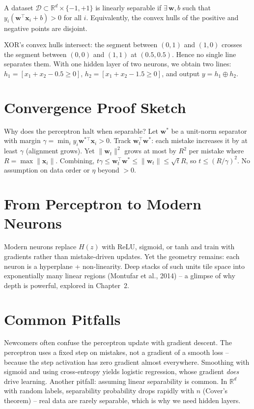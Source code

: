\begin{definition}
A dataset $\mathcal{D}\subset\mathbb{R}^d\times\{-1,+1\}$ is linearly separable
if $\exists\,\mathbf{w},b$ such that $y_i(\mathbf{w}^{\top}\mathbf{x}_i+b)>0$ for all $i$.
Equivalently, the convex hulls of the positive and negative points are disjoint.
\end{definition}

XOR's convex hulls intersect: the segment between $(0,1)$ and $(1,0)$ crosses
the segment between $(0,0)$ and $(1,1)$ at $(0.5,0.5)$. Hence no single line
separates them. With one hidden layer of two neurons, we obtain two lines:
$h_1=[x_1+x_2-0.5\ge0]$, $h_2=[x_1+x_2-1.5\ge0]$, and output $y=h_1\oplus h_2$.

\section{Convergence Proof Sketch}
Why does the perceptron halt when separable? Let $\mathbf{w}^*$ be a unit-norm
separator with margin $\gamma=\min_i y_i\mathbf{w}^{*\top}\mathbf{x}_i>0$.
Track $\mathbf{w}_t^{\top}\mathbf{w}^*$: each mistake increases it by at least
$\gamma$ (alignment grows). Yet $\|\mathbf{w}_t\|^2$ grows at most by $R^2$
per mistake where $R=\max\|\mathbf{x}_i\|$. Combining,
$t\gamma\le\mathbf{w}_t^{\top}\mathbf{w}^*\le\|\mathbf{w}_t\|\le\sqrt{t}R$,
so $t\le(R/\gamma)^2$. No assumption on data order or $\eta$ beyond $>0$.

\section{From Perceptron to Modern Neurons}
Modern neurons replace $H(z)$ with ReLU, sigmoid, or tanh and train with
gradients rather than mistake-driven updates. Yet the geometry remains: each
neuron is a hyperplane + non-linearity. Deep stacks of such units tile space
into exponentially many linear regions (Montufar et al., 2014) -- a glimpse of
why depth is powerful, explored in Chapter~2.

\section{Common Pitfalls}
Newcomers often confuse the perceptron update with gradient descent. The
perceptron uses a fixed step on mistakes, not a gradient of a smooth loss --
because the step activation has zero gradient almost everywhere. Smoothing with
sigmoid and using cross-entropy yields logistic regression, whose gradient
\emph{does} drive learning. Another pitfall: assuming linear separability is
common. In $\mathbb{R}^d$ with random labels, separability probability drops
rapidly with $n$ (Cover's theorem) -- real data are rarely separable, which is
why we need hidden layers.

